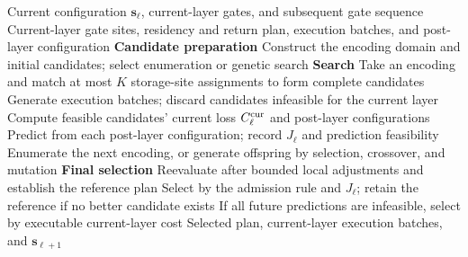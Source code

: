\begin{algorithm}[!htb]
\caption{}
\label{alg:solver}
\small
\begin{PaperRevisionBlock}
\algrenewcommand{}
\algrenewcommand{}
\algrenewcommand{}
\algrenewcommand{}
\algrenewcommand{}
\begin{algorithmic}[1]
\Require Current configuration $\mathbf{s}_\ell$, current-layer gates, and subsequent gate sequence
\Ensure Current-layer gate sites, residency and return plan, execution batches, and post-layer configuration
\Statex \textbf{Candidate preparation}
\State Construct the encoding domain and initial candidates; select enumeration or genetic search
\Statex \textbf{Search}
  \State Take an encoding and match at most $K$ storage-site assignments to form complete candidates
  \State Generate execution batches; discard candidates infeasible for the current layer
  \State Compute feasible candidates' current loss $C_\ell^{\rm cur}$ and post-layer configurations
  \State Predict from each post-layer configuration; record $J_\ell$ and prediction feasibility
  \State Enumerate the next encoding, or generate offspring by selection, crossover, and mutation
\EndWhile
\Statex \textbf{Final selection}
\State Reevaluate after bounded local adjustments and establish the reference plan
\State Select by the admission rule and $J_\ell$; retain the reference if no better candidate exists
\State If all future predictions are infeasible, select by executable current-layer cost
\State \Return Selected plan, current-layer execution batches, and $\mathbf{s}_{\ell+1}$
\end{algorithmic}
\end{PaperRevisionBlock}
\end{algorithm}
